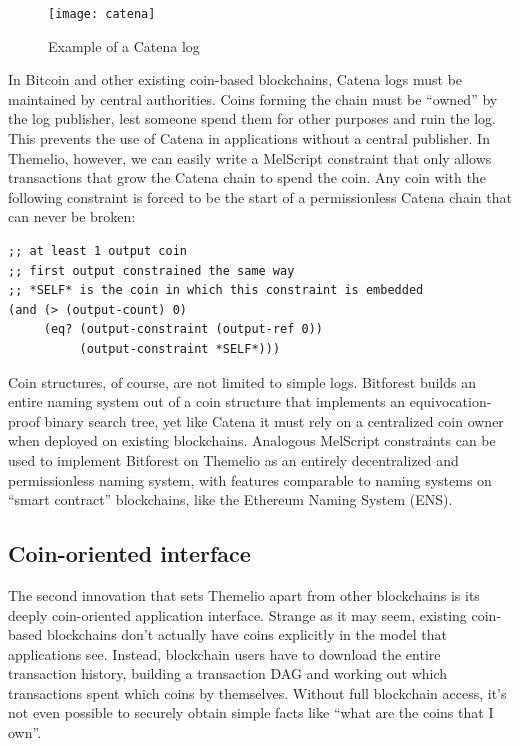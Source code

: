 \documentclass[headinclude]{scrbook}
\begin{document}
\begin{figure}
    \centering \texttt{[image: catena]}
    \caption{Example of a Catena log}
    \label{fig:catena}
\end{figure}

In Bitcoin and other existing coin-based blockchains, Catena logs must be maintained by central authorities. Coins forming the chain must be ``owned'' by the log publisher, lest someone spend them for other purposes and ruin the log. This prevents the use of Catena in applications without a central publisher. In Themelio, however, we can easily write a MelScript constraint that only allows transactions that grow the Catena chain to spend the coin. Any coin with the following constraint is forced to be the start of a permissionless Catena chain that can never be broken:
\begin{lstlisting}
;; at least 1 output coin
;; first output constrained the same way
;; *SELF* is the coin in which this constraint is embedded
(and (> (output-count) 0)
     (eq? (output-constraint (output-ref 0))
          (output-constraint *SELF*)))
\end{lstlisting}

Coin structures, of course, are not limited to simple logs. Bitforest \cite{dong2018bitforest} builds an entire naming system out of a coin structure that implements an equivocation-proof binary search tree, yet like Catena it must rely on a centralized coin owner when deployed on existing blockchains. Analogous MelScript constraints can be used to implement Bitforest on Themelio as an entirely decentralized and permissionless naming system, with features comparable to naming systems on ``smart contract'' blockchains, like the Ethereum Naming System (ENS).

\subsection{Coin-oriented interface}

The second innovation that sets Themelio apart from other blockchains is its deeply coin-oriented application interface. Strange as it may seem, existing coin-based blockchains don't actually have coins explicitly in the model that applications see. Instead, blockchain users have to download the entire transaction history, building a transaction DAG and working out which transactions spent which coins by themselves. Without full blockchain access, it's not even possible to securely obtain simple facts like ``what are the coins that I own''.
\end{document}
